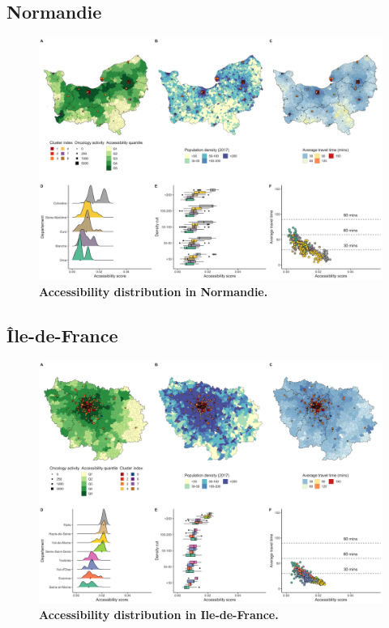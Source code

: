 \subsection*{Normandie}

\begin{figure}[H]
    \includegraphics[width=\textwidth]{images/camion/region_accessibility/accessibility_Normandie.png}
    \centering
    \caption{
        \textbf{Accessibility distribution in Normandie.}
    }
\end{figure}

\subsection*{Île-de-France}

\begin{figure}[H]
    \includegraphics[width=\textwidth]{images/camion/region_accessibility/accessibility_Ile-de-France.png}
    \centering
    \caption{
        \textbf{Accessibility distribution in Ile-de-France.}
    }
\end{figure}

